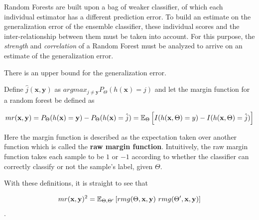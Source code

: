 Random Forests are built upon a bag of weaker classifier, of which each individual estimator has a different prediction error. To build an estimate on the generalization error of the ensemble classifier, these individual scores and the inter-relationship between them must be taken into account. For this purpose, the \textit{strength} and \textit{correlation} of a Random Forest must be analyzed to arrive on an estimate of the generalization error.


\begin{theorem}
There is an upper bound for the generalization error.
\end{theorem}

Define $\hat{j}(\textbf{x},\textbf{y})$ as $arg max_{j\neq \textbf{y}} P_{\Theta}(h(\textbf{x}) = j)$ and let the margin function for a random forest be defined as

\begin{equation}\label{eq:rf-marginFunRf}
mr(\textbf{x},\textbf{y}) =  P_{\Theta}(h(\textbf{x}) = \textbf{y}) - P_{\Theta}(h(\textbf{x}) = \hat{j})
\\
= \operatorname{\mathbb{E}}_{\Theta} \left[  I(h(\textbf{x},\Theta ) = y ) - I( h( \textbf{x},\Theta ) = \hat{j} )  \right]
\end{equation}




Here the margin function is described as the expectation taken over another function which is called the \textbf{raw margin function}\label{eq:rf-rawMarginFun}. Intuitively, the raw margin function takes each sample to be $1$ or $-1$ according to whether the classifier can correctly classify or not the sample's label, given $\Theta$.

With these definitions, it is straight to see that

$$mr( \textbf{x},\textbf{y} )^2 = \Expect_{\Theta, \Theta'} \left[ rmg( \Theta,\textbf{x},\textbf{y} ) \ rmg(\Theta',\textbf{x},\textbf{y} )  \right] $$.


